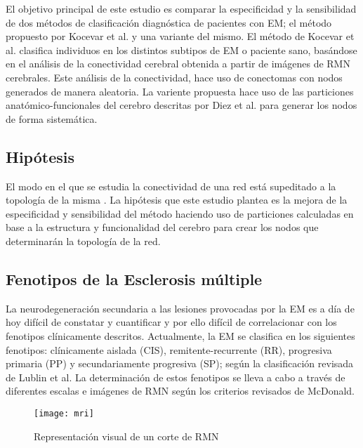 \documentclass[fleqn,10pt]{UICArticle} %
\begin{document}
El objetivo principal de este estudio es comparar la especificidad y la sensibilidad de dos métodos de clasificación diagnóstica de pacientes con EM; el método propuesto por Kocevar et al.\cite{Kocevar2016} y una variante del mismo. El método de Kocevar et al.\cite{Kocevar2016} clasifica individuos en los distintos subtipos de EM o paciente sano, basándose en el análisis de la conectividad cerebral obtenida a partir de imágenes de RMN cerebrales. Este análisis de la conectividad, hace uso de conectomas con nodos generados de manera aleatoria. La variente propuesta hace uso de las particiones anatómico-funcionales del cerebro descritas por Diez et al.\cite{Diez2015} para generar los nodos de forma sistemática.

\subsection{Hipótesis}

El modo en el que se estudia la conectividad de una red está supeditado a la topología de la misma \cite{Fornito, Zalesky2010}. La hipótesis que este estudio plantea es la mejora de la especificidad y sensibilidad del método haciendo uso de particiones calculadas en base a la estructura y funcionalidad del cerebro para crear los nodos que determinarán la topología de la red. 

\subsection{Fenotipos de la Esclerosis múltiple}

La neurodegeneración secundaria a las lesiones provocadas por la EM es a día de hoy difícil de constatar y cuantificar y por ello difícil de correlacionar con los fenotipos clínicamente descritos. Actualmente, la EM se clasifica en los siguientes fenotipos: clínicamente aislada (CIS), remitente-recurrente (RR), progresiva primaria (PP) y secundariamente progresiva (SP); según la clasificación revisada de Lublin et al\cite{Lublin2014}. La determinación de estos fenotipos se lleva a cabo a través de diferentes escalas e imágenes de RMN según los criterios revisados de McDonald\cite{Polman20112}.

\begin{figure}[!h]
	\centering
	\texttt{[image: mri]}
	\caption{Representación visual de un corte de RMN}
	\label{fig:voxeles}
\end{figure}
\end{document}
